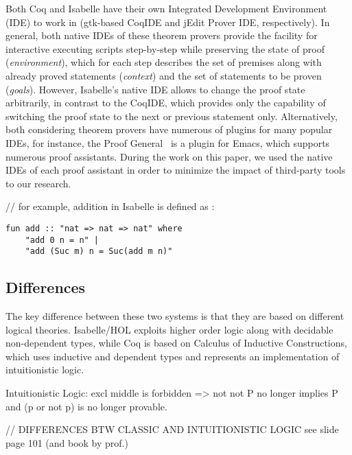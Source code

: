 \documentclass[article]{aaltoseries}
\begin{document}
Both Coq and Isabelle have their own Integrated Development Environment (IDE) to work in (gtk-based CoqIDE and jEdit Prover IDE, respectively). In general, both native IDEs of these theorem provers provide the facility for interactive executing scripts step-by-step while preserving the state of proof (\textit{environment}), which for each step describes the set of premises along with already proved statements (\textit{context}) and the set of statements to be proven (\textit{goals}). However, Isabelle's native IDE allows to change the proof state arbitrarily, in contrast to the CoqIDE, which provides only the capability of switching the proof state to the next or previous statement only. Alternatively, both considering theorem provers have numerous of plugins for many popular IDEs, for instance, the Proof General~\cite{tool_PG} is a plugin for Emacs, which supports numerous proof assistants. During the work on this paper, we used the native IDEs of each proof assistant in order to minimize the impact of third-party tools to our research.

// for example, addition in Isabelle is defined as :
\begin{lstlisting}[language=isabelle]
fun add :: "nat => nat => nat" where
	"add 0 n = n" |
	"add (Suc m) n = Suc(add m n)"
\end{lstlisting}


\subsection{Differences}


The key difference between these two systems is that they are based on different logical theories. Isabelle/HOL exploits higher order logic along with decidable non-dependent types, while Coq is based on Calculus of Inductive Constructions, which uses inductive and dependent types and represents an implementation of intuitionistic logic.

Intuitionistic Logic: excl middle is forbidden => not not P no longer implies P and (p or not p) is no longer provable.


// DIFFERENCES BTW CLASSIC AND INTUITIONISTIC LOGIC
see slide page 101 %
(and book by prof.)
\end{document}
